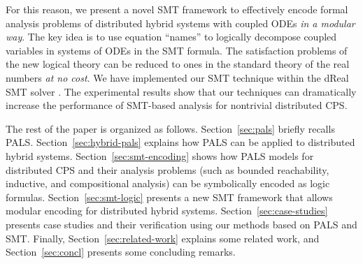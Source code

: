 For this reason, 
we present a novel SMT framework
to  effectively encode formal analysis problems
of distributed hybrid systems with coupled ODEs \emph{in a modular way}.
The key idea is to use equation ``names'' %
to logically decompose coupled variables in systems of ODEs in the SMT formula.
The satisfaction problems of the new logical theory 
can be reduced to ones in the standard theory of the real numbers \emph{at no cost}.
%
We have implemented our SMT technique within the \textsf{dReal} SMT solver \cite{dReal}.
The experimental results show that our techniques can dramatically increase 
the performance of SMT-based analysis for nontrivial distributed CPS.



The rest of the paper is organized as follows.
%
Section~\ref{sec:pals} briefly recalls PALS.
Section~\ref{sec:hybrid-pals} explains how PALS can be applied to distributed hybrid systems.
Section~\ref{sec:smt-encoding} shows how PALS models for distributed CPS
and their analysis problems (such as bounded reachability, inductive, and compositional analysis)
can be symbolically encoded as logic formulas.
Section~\ref{sec:smt-logic} presents a new SMT framework that allows 
modular encoding for distributed hybrid systems. %
Section~\ref{sec:case-studies} presents case studies and their verification 
using our methods based on PALS and SMT.
Finally,
Section~\ref{sec:related-work} explains some related work,
and 
Section~\ref{sec:concl} presents some concluding remarks.



